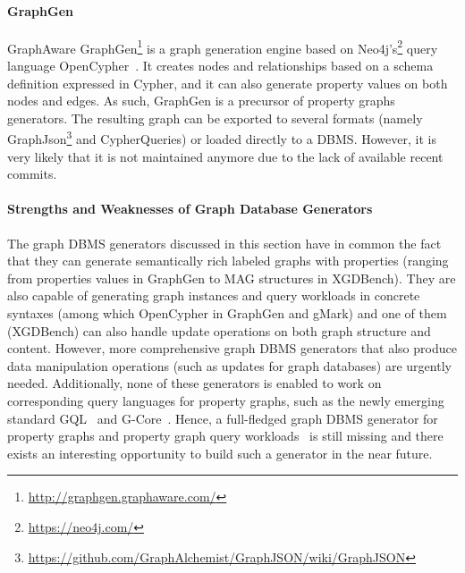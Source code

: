 
\paragraph{GraphGen}  GraphAware GraphGen\footnote{\url{http://graphgen.graphaware.com/}} is a graph generation engine based on Neo4j's\footnote{\url{https://neo4j.com/}} query language OpenCypher~\cite{GraphGen}.  It creates nodes and relationships based on a schema definition expressed in Cypher, and it can also generate property values on both
nodes and edges. As such, GraphGen is a precursor of property graphs generators. The resulting graph can be exported to several formats (namely GraphJson\footnote{\url{https://github.com/GraphAlchemist/GraphJSON/wiki/GraphJSON}} and CypherQueries) or loaded directly to a DBMS. However, it is very likely that it is not maintained anymore due to the lack of available recent commits.

\paragraph{Strengths and Weaknesses of Graph Database Generators}
The graph DBMS generators discussed in this section have in common the fact that they can generate semantically rich labeled graphs with properties (ranging from properties values in GraphGen to MAG structures in XGDBench). They are also capable of generating graph instances and query workloads in
concrete syntaxes (among which OpenCypher in GraphGen and gMark) and one of them (XGDBench) can also handle update operations on both graph structure and content. However, more comprehensive graph DBMS generators that also produce data manipulation operations (such as updates for graph databases) are urgently needed. Additionally, none of these generators is enabled to work on corresponding query languages for property graphs, such as the newly emerging standard GQL~\cite{gql-2018} and G-Core~\cite{AnglesABBFGLPPS18}. Hence, a full-fledged graph DBMS generator for property graphs and property graph query workloads~\cite{BFVY18} is still missing and there exists an interesting opportunity to build such a generator in the near future.

